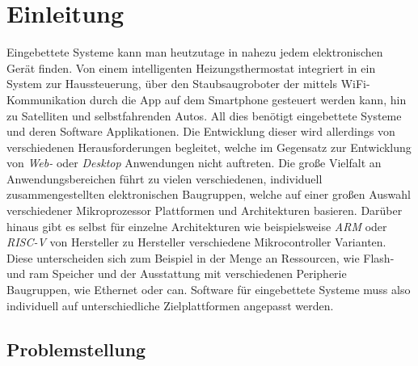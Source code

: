 
\chapter{Einleitung}

Eingebettete Systeme kann man heutzutage in nahezu jedem elektronischen Gerät
finden.
Von einem intelligenten Heizungsthermostat integriert in ein System zur
Haussteuerung, über den Staubsaugroboter der mittels WiFi-Kommunikation durch
die App auf dem Smartphone gesteuert werden kann, hin zu Satelliten und
selbstfahrenden Autos.
All dies benötigt eingebettete Systeme und deren Software Applikationen.
Die Entwicklung dieser wird allerdings von verschiedenen Herausforderungen
begleitet, welche im Gegensatz zur Entwicklung von \textit{Web-} oder
\textit{Desktop} Anwendungen nicht auftreten.\newline
Die große Vielfalt an Anwendungsbereichen führt zu vielen verschiedenen,
individuell zusammengestellten elektronischen Baugruppen, welche auf einer
großen Auswahl verschiedener Mikroprozessor Plattformen und Architekturen
basieren.\newline
Darüber hinaus gibt es selbst für einzelne Architekturen wie beispielsweise
\textit{ARM} oder \textit{RISC-V} von Hersteller zu Hersteller verschiedene
Mikrocontroller Varianten.
Diese unterscheiden sich zum Beispiel in der Menge an Ressourcen, wie Flash-
und \acs{ram} Speicher und der Ausstattung mit verschiedenen
Peripherie Baugruppen, wie Ethernet oder \acs{can}.\newline
Software für eingebettete Systeme muss also individuell auf unterschiedliche
Zielplattformen angepasst werden.

\section{Problemstellung}

